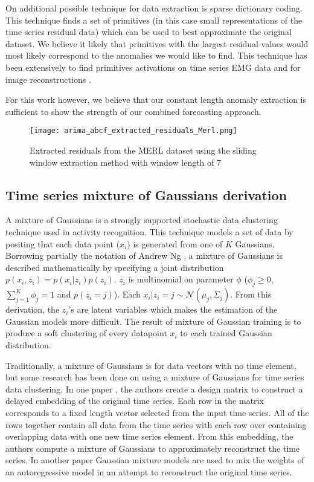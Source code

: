 On additional possible technique for data extraction is sparse dictionary coding.  This technique finds a set of primitives (in this case small representations of the time series residual data) which can be used to best approximate the original dataset.  We believe it likely that primitives with the largest residual values would most likely correspond to the anomalies we would like to find.  This technique has been extensively to find primitives activations on time series EMG data \cite{Kim2010} and for image reconstructions \cite{Mairal2009}.  

For this work however, we believe that our constant length anomaly extraction is sufficient to show the strength of our combined forecasting approach.

\begin{figure}
	\begin{center}
		\texttt{[image: arima\_abcf\_extracted\_residuals\_Merl.png]}
	\end{center}
	\caption{Extracted residuals from the MERL dataset using the sliding window extraction method with window length of 7}
	\label{fig:extracted_residuals}
\end{figure}


\subsection{Time series mixture of Gaussians derivation}
A mixture of Gaussians is a strongly supported stochastic data clustering technique used in activity recognition.  This technique models a set of data by positing that each data point ($x_{i}$) is generated from one of $K$ Gaussians.  Borrowing partially the notation of Andrew Ng \cite{Ng2008}, a mixture of Gaussians is described mathematically by specifying a joint distribution $p(x_{i}, z_{i}) = p(x_{i}|z_{i})p(z_{i})$.  $z_{i}$ is multinomial on parameter $\phi$  ($\phi_{j} \ge 0$,  $\sum_{j=1}^{K}{ \phi_{j}} = 1$ and $p(z_{i} = j)$).  Each $x_{i}|z_{i} = j \sim \mathcal{N}(\mu_{j}, \Sigma_{j})$.  From this derivation, the $z_{i}$'s are latent variables which makes the estimation of the Gaussian models more difficult.  The result of mixture of Gaussian training is to produce a soft clustering of every datapoint $x_{i}$ to each trained Gaussian distribution.

Traditionally, a mixture of Gaussians is for data vectors with no time element, but some research has been done on using a mixture of Gaussians for time series data clustering.  In one paper \cite{Eirola2013}, the authors create a design matrix to construct a delayed embedding of the original time series.  Each row in the matrix corresponds to a fixed length vector selected from the input time series.  All of the rows together contain all data from the time series with each row over containing overlapping data with one new time series element.  From this embedding, the authors compute a mixture of Gaussians to approximately reconstruct the time series.  In another paper \cite{Kalliovirta2012} Gaussian mixture models are used to mix the weights of an autoregressive model in an attempt to reconstruct the original time series.

